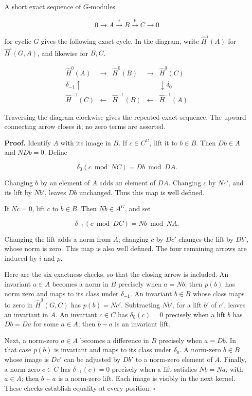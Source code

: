 \documentclass[11pt,a4paper]{article}
\begin{document}
A short exact sequence of \(G\)-modules

\[
0\longrightarrow A\xrightarrow{i}B\xrightarrow{p}C\longrightarrow0
\]

for cyclic \(G\) gives the following exact cycle. In the diagram, write
\(\widehat H^i(A)\) for \(\widehat H^i(G,A)\), and likewise for \(B,C\).

\[
\begin{array}{ccccc}
\widehat H^0(A)&\longrightarrow&\widehat H^0(B)&\longrightarrow&\widehat H^0(C)\\
{\scriptstyle\delta_{-1}}\uparrow&&&&\downarrow{\scriptstyle\delta_0}\\
\widehat H^{-1}(C)&\longleftarrow&\widehat H^{-1}(B)&\longleftarrow&\widehat H^{-1}(A)
\end{array}
\]

Traversing the diagram clockwise gives the repeated exact sequence. The
upward connecting arrow closes it; no zero terms are asserted.

\textbf{Proof.} Identify \(A\) with its image in \(B\). If \(c\in C^G\),
lift it to \(b\in B\). Then \(Db\in A\) and \(NDb=0\). Define

\[
\delta_0(c\bmod NC)=Db\bmod DA.
\]

Changing \(b\) by an element of \(A\) adds an element of \(DA\).
Changing \(c\) by \(Nc'\), and its lift by \(Nb'\), leaves \(Db\)
unchanged. Thus this map is well defined.

If \(Nc=0\), lift \(c\) to \(b\in B\). Then \(Nb\in A^G\), and set

\[
\delta_{-1}(c\bmod DC)=Nb\bmod NA.
\]

Changing the lift adds a norm from \(A\); changing \(c\) by \(Dc'\)
changes the lift by \(Db'\), whose norm is zero. This map is also well
defined. The four remaining arrows are induced by \(i\) and \(p\).

Here are the six exactness checks, so that the closing arrow is
included. An invariant \(a\in A\) becomes a norm in \(B\) precisely when
\(a=Nb\); then \(p(b)\) has norm zero and maps to its class under
\(\delta_{-1}\). An invariant \(b\in B\) whose class maps to zero in
\(\widehat H^0(G,C)\) has \(p(b)=Nc'\). Subtracting \(Nb'\), for a lift
\(b'\) of \(c'\), leaves an invariant in \(A\). An invariant \(c\in C\)
has \(\delta_0(c)=0\) precisely when a lift \(b\) has \(Db=Da\) for some
\(a\in A\); then \(b-a\) is an invariant lift.

Next, a norm-zero \(a\in A\) becomes a difference in \(B\) precisely
when \(a=Db\). In that case \(p(b)\) is invariant and maps to its class
under \(\delta_0\). A norm-zero \(b\in B\) whose image is \(Dc'\) can be
adjusted by \(Db'\) to a norm-zero element of \(A\). Finally, a
norm-zero \(c\in C\) has \(\delta_{-1}(c)=0\) precisely when a lift
satisfies \(Nb=Na\), with \(a\in A\); then \(b-a\) is a norm-zero lift.
Each image is visibly in the next kernel. These checks establish
equality at every position. \(\square\)
\end{document}
